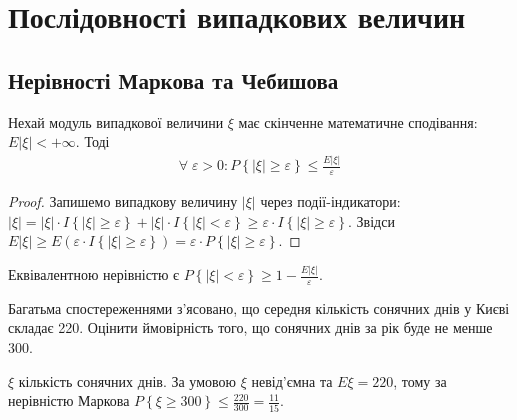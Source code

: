 \section{Послідовності випадкових величин}
\subsection{Нерівності Маркова та Чебишова}
\begin{theorem*}
    Нехай модуль випадкової величини $\xi$ має скінченне математичне сподівання: $E|\xi| < +\infty$.
    Тоді 
    \begin{gather}\label{Markov_ineq}
        \forall \; \varepsilon >0 : P\left\{ |\xi| \geq \varepsilon\right\} \leq \frac{E|\xi|}{\varepsilon}
    \end{gather}
\end{theorem*}
\begin{proof}
    Запишемо випадкову величину $|\xi|$ через події-індикатори: 
    $|\xi| = |\xi|\cdot I\left\{|\xi| \geq \varepsilon\right\} + |\xi|\cdot I\left\{|\xi| < \varepsilon\right\} \geq
    \varepsilon\cdot I\left\{|\xi| \geq \varepsilon\right\}$. Звідси $E|\xi| \geq E \left( \varepsilon\cdot I\left\{|\xi| \geq \varepsilon\right\}\right) =
    \varepsilon \cdot P\left\{ |\xi| \geq \varepsilon\right\}$.
\end{proof}
\begin{remark}
    Еквівалентною нерівністю є $P\left\{ |\xi| < \varepsilon\right\} \geq 1 - \frac{E|\xi|}{\varepsilon}$.
\end{remark}

\begin{example}
    Багатьма спостереженнями з'ясовано, що середня кількість
    сонячних днів у Києві складає 220. Оцінити ймовірність того, що
    сонячних днів за рік буде не менше 300.

     $\xi$ кількість сонячних днів. За умовою $\xi$ невід'ємна та $E\xi = 220$,
    тому за нерівністю Маркова $P\left\{ \xi \geq 300\right\} \leq \frac{220}{300} = \frac{11}{15}$.
\end{example}

